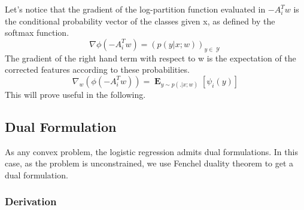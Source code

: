 \documentclass{article}
\DeclareMathOperator{\1}{\mathbb{1}}
\DeclareMathOperator{\E}{\mathbf{E}}
\DeclareMathOperator{\Y}{\mathcal{Y}}
\begin{document}
Let's notice that the gradient of the log-partition function evaluated in $-A_i^Tw$ is the conditional probability vector of the classes given x, as defined by the softmax function.
\begin{equation}
	\nabla \phi(-A_i^Tw) = (p(y | x ; w))_{y \in \Y}
\end{equation}
The gradient of the right hand term with respect to w is the expectation of the corrected features according to these probabilities.
\begin{equation}
	\nabla_w (\phi(-A_i^Tw)) = \E_{y \sim p(. | x ; w)} [\psi_i(y)]
\end{equation}
This will prove useful in the following.



\subsection{Dual Formulation}

As any convex problem, the logistic regression admits dual formulations.
In this case, as the problem is unconstrained, we use Fenchel duality theorem to get a dual formulation.

\subsubsection{Derivation}
\end{document}
